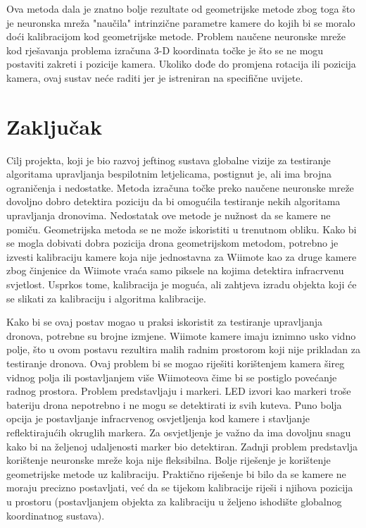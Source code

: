 \documentclass[times, utf8, diplomski]{fer}
\begin{document}
Ova metoda dala je znatno bolje rezultate od geometrijske metode zbog toga što je neuronska mreža "naučila" intrinzične parametre kamere do kojih bi se moralo doći kalibracijom kod geometrijske metode. Problem naučene neuronske mreže kod rješavanja problema izračuna 3-D koordinata točke je što se ne mogu postaviti zakreti i pozicije kamera. Ukoliko dođe do promjena rotacija ili pozicija kamera, ovaj sustav neće raditi jer je istreniran na specifične uvijete.  

\chapter{Zaključak}

Cilj projekta, koji je bio razvoj jeftinog sustava globalne vizije za testiranje algoritama upravljanja bespilotnim letjelicama, postignut je, ali ima brojna ograničenja i nedostatke. Metoda izračuna točke preko naučene neuronske mreže dovoljno dobro detektira poziciju da bi omogućila testiranje nekih algoritama upravljanja dronovima. Nedostatak ove metode je nužnost da se kamere ne pomiču. Geometrijska metoda se ne može iskoristiti u trenutnom obliku. Kako bi se mogla dobivati dobra pozicija drona geometrijskom metodom, potrebno je izvesti kalibraciju kamere koja nije jednostavna za Wiimote kao za druge kamere zbog činjenice da Wiimote vraća samo piksele na kojima detektira infracrvenu svjetlost. Usprkos tome, kalibracija je moguća, ali zahtjeva izradu objekta koji će se slikati za kalibraciju i algoritma kalibracije.

Kako bi se ovaj postav mogao u praksi iskoristit za testiranje upravljanja dronova, potrebne su brojne izmjene. Wiimote kamere imaju iznimno usko vidno polje, što u ovom postavu rezultira malih radnim prostorom koji nije prikladan za testiranje dronova. Ovaj problem bi se mogao riješiti korištenjem kamera šireg vidnog polja ili postavljanjem više Wiimoteova čime bi se postiglo povećanje radnog prostora. Problem predstavljaju i markeri. LED izvori kao markeri troše bateriju drona nepotrebno i ne mogu se detektirati iz svih kuteva. Puno bolja opcija je postavljanje infracrvenog osvjetljenja kod kamere i stavljanje reflektirajućih okruglih markera. Za osvjetljenje je važno da ima dovoljnu snagu kako bi na željenoj udaljenosti marker bio detektiran. Zadnji problem predstavlja korištenje neuronske mreže koja nije fleksibilna. Bolje riješenje je korištenje geometrijske metode uz kalibraciju. Praktično riješenje bi bilo da se kamere ne moraju precizno postavljati, već da se tijekom kalibracije riješi i njihova pozicija u prostoru (postavljanjem objekta za kalibraciju u željeno ishodište globalnog koordinatnog sustava).
\end{document}
